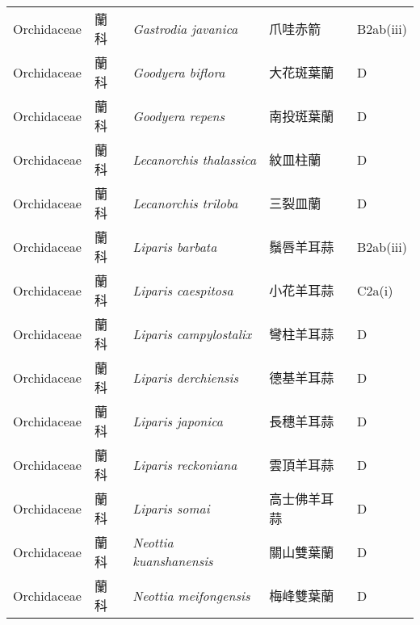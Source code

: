 {\begin{longtable}{p{2.5cm}p{2.5cm}p{4.5cm}p{2.5cm}p{3cm}}
    Orchidaceae & 蘭科 & \textit{Gastrodia javanica}  & 爪哇赤箭 & B2ab(iii) \index{Gastrodia@\textit{Gastrodia}!javanica@\textit{javanica}}  \index{爪哇赤箭} \\
    Orchidaceae & 蘭科 & \textit{Goodyera biflora}  & 大花斑葉蘭 & D \index{Goodyera@\textit{Goodyera}!biflora@\textit{biflora}}  \index{大花斑葉蘭} \\
    Orchidaceae & 蘭科 & \textit{Goodyera repens}  & 南投斑葉蘭 & D \index{Goodyera@\textit{Goodyera}!repens@\textit{repens}}  \index{南投斑葉蘭} \\
    Orchidaceae & 蘭科 & \textit{Lecanorchis thalassica}  & 紋皿柱蘭 & D \index{Lecanorchis@\textit{Lecanorchis}!thalassica@\textit{thalassica}}  \index{紋皿柱蘭} \\
    Orchidaceae & 蘭科 & \textit{Lecanorchis triloba}  & 三裂皿蘭 & D \index{Lecanorchis@\textit{Lecanorchis}!triloba@\textit{triloba}}  \index{三裂皿蘭} \\
    Orchidaceae & 蘭科 & \textit{Liparis barbata}  & 鬚唇羊耳蒜 & B2ab(iii) \index{Liparis@\textit{Liparis}!barbata@\textit{barbata}}  \index{鬚唇羊耳蒜} \\
    Orchidaceae & 蘭科 & \textit{Liparis caespitosa}  & 小花羊耳蒜 & C2a(i) \index{Liparis@\textit{Liparis}!caespitosa@\textit{caespitosa}}  \index{小花羊耳蒜} \\
    Orchidaceae & 蘭科 & \textit{Liparis campylostalix}  & 彎柱羊耳蒜 & D \index{Liparis@\textit{Liparis}!campylostalix@\textit{campylostalix}}  \index{彎柱羊耳蒜} \\
    Orchidaceae & 蘭科 & \textit{Liparis derchiensis}  & 德基羊耳蒜 & D \index{Liparis@\textit{Liparis}!derchiensis@\textit{derchiensis}}  \index{德基羊耳蒜} \\
    Orchidaceae & 蘭科 & \textit{Liparis japonica}  & 長穗羊耳蒜 & D \index{Liparis@\textit{Liparis}!japonica@\textit{japonica}}  \index{長穗羊耳蒜} \\
    Orchidaceae & 蘭科 & \textit{Liparis reckoniana}  & 雲頂羊耳蒜 & D \index{Liparis@\textit{Liparis}!reckoniana@\textit{reckoniana}}  \index{雲頂羊耳蒜} \\
    Orchidaceae & 蘭科 & \textit{Liparis somai}  & 高士佛羊耳蒜 & D \index{Liparis@\textit{Liparis}!somai@\textit{somai}}  \index{高士佛羊耳蒜} \\
    Orchidaceae & 蘭科 & \textit{Neottia kuanshanensis}  & 關山雙葉蘭 & D \index{Neottia@\textit{Neottia}!kuanshanensis@\textit{kuanshanensis}}  \index{關山雙葉蘭} \\
    Orchidaceae & 蘭科 & \textit{Neottia meifongensis}  & 梅峰雙葉蘭 & D \index{Neottia@\textit{Neottia}!meifongensis@\textit{meifongensis}}  \index{梅峰雙葉蘭} \\

\end{longtable}}
